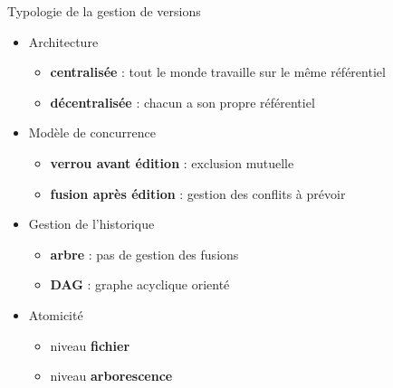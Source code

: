 \begin{frame}{%
\protect\hypertarget{typologie-de-la-gestion-de-versions}{%
Typologie de la gestion de versions}}

\begin{itemize}
\tightlist
\item
  Architecture

  \begin{itemize}
  \tightlist
  \item
    \textbf{centralisée} : tout le monde travaille sur le même
    référentiel
  \item
    \textbf{décentralisée} : chacun a son propre référentiel
  \end{itemize}
\item
  Modèle de concurrence

  \begin{itemize}
  \tightlist
  \item
    \textbf{verrou avant édition} : exclusion mutuelle
  \item
    \textbf{fusion après édition} : gestion des conflits à prévoir
  \end{itemize}
\item
  Gestion de l’historique

  \begin{itemize}
  \tightlist
  \item
    \textbf{arbre} : pas de gestion des fusions
  \item
    \textbf{DAG} : graphe acyclique orienté
  \end{itemize}
\item
  Atomicité

  \begin{itemize}
  \tightlist
  \item
    niveau \textbf{fichier}
  \item
    niveau \textbf{arborescence}
  \end{itemize}
\end{itemize}

\end{frame}

